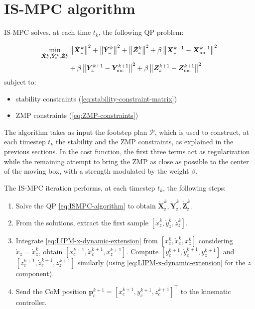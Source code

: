\section{IS-MPC algorithm}
IS-MPC solves, at each time $t_k$, the following QP problem:
\begin{braced}
\begin{equation}
\begin{split}
\min_{\dot{\bm{X}}_\text{z}^k, \dot{\bm{Y}}_\text{z}^k, \dot{\bm{Z}}_\text{z}^k}
&\left\|\dot{\bm{X}}_z^k\right\|^2 + \left\|\dot{\bm{Y}}_z^k\right\|^2 + \left\|\dot{\bm{Z}}_z^k\right\|^2+\beta \left\|\bm{X}_z^{k+1} - {\bm{X}}_{\rm mc}^{k+1}\right\|^2 \\& + \beta \left\|\bm{Y}_z^{k+1} - {\bm{Y}}_{\rm mc}^{k+1}\right\|^2 + \beta \left\|\bm{Z}_z^{k+1} - {\bm{Z}}_{\rm mc}^{k+1}\right\|^2 \\
\end{split}
\label{eq:ISMPC-algorithm}
\end{equation}
\hspace{0.25cm} subject to:
\begin{itemize}
    \item stability constraints (\ref{eq:stability-constraint-matrix})
    \item ZMP constraints (\ref{eq:ZMP-constraints})
\end{itemize}
\end{braced}

The algorithm takes as input the footstep plan $\mathcal{P}$, which is used
to construct, at each timestep $t_k$ the stability and the ZMP constraints,
as explained in the previous sections.
In the cost function, the first three terms act as regularization while the
remaining attempt to bring the ZMP as close as possible to the center of the
moving box, with a strength modulated by the weight $\beta$.

The IS-MPC iteration performs, at each timestep $t_k$, the following steps:
\begin{enumerate}
    \item Solve the QP \eqref{eq:ISMPC-algorithm} to obtain 
        $\dot{\bm{X}}_\text{z}^k, \dot{\bm{Y}}_\text{z}^k, \dot{\bm{Z}}_\text{z}^k$.
    \item From the solutions, extract the first sample $\left[\dot x_z^k, \dot y_z^k, \dot z_z^k\right]$.
    \item Integrate \eqref{eq:LIPM-x-dynamic-extension} from
        $\left[x_c^k, \dot{x}_c^k, x_z^k\right]$ considering $\dot{x}_z=\dot{x}_z^k$, obtain
        $\left[x_c^{k+1}, \dot{x}_c^{k+1}, x_z^{k+1}\right]$.
        Compute $\left[y_c^{k+1}, \dot{y}_c^{k+1}, y_z^{k+1}\right]$ and 
        $\left[z_c^{k+1}, \dot{z}_c^{k+1}, z_z^{k+1}\right]$ similarly (using
        \eqref{eq:LIPM-x-dynamic-extension} for the $z$ component).
    \item Send the CoM position $\bm{p}_c^{k+1}=\left[x_c^{k+1}, y_c^{k+1}, z_c^{k+1}\right]^\top$
        to the kinematic controller.
\end{enumerate}

